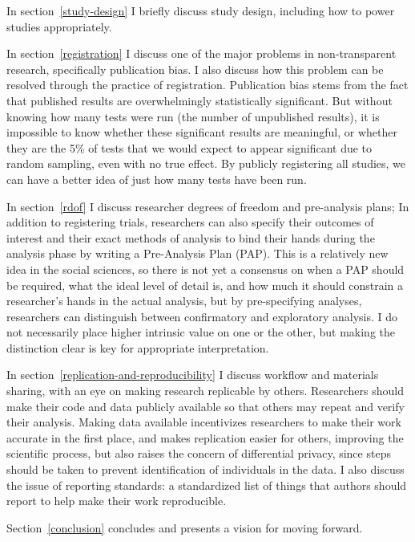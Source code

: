 \documentclass[12pt] {article}
\begin{document}
In section~\ref{study-design} I briefly discuss study design, including how to power studies
appropriately.

In section~\ref{registration} I discuss one of the major problems in non-transparent
research, specifically publication bias. I also discuss how this
problem can be resolved through the practice of registration.
Publication bias stems from the fact that published results are
overwhelmingly statistically significant. But without knowing how many
tests were run (the number of unpublished results), it is impossible to know whether these significant
results are meaningful, or whether they are the 5\% of tests that we
would expect to appear significant due to random sampling, even with no
true effect. By publicly registering all studies, we can have a better
idea of just how many tests have been run.

In section~\ref{rdof} I discuss researcher degrees of freedom and pre-analysis
plans; In addition to registering trials, researchers can also
specify their outcomes of interest and their exact methods of analysis
to bind their hands during the analysis phase by writing a Pre-Analysis
Plan (PAP). This is a relatively new idea in the social sciences, so
there is not yet a consensus on when a PAP should be required, what the
ideal level of detail is, and how much it should constrain a
researcher's hands in the actual analysis, but by pre-specifying analyses,
researchers can distinguish between confirmatory and exploratory
analysis. I do not necessarily place higher intrinsic value on one or
the other, but making the distinction clear is key for appropriate
interpretation.

In section~\ref{replication-and-reproducibility} I discuss workflow and materials sharing, with an eye on
making research replicable by others. Researchers should make their code
and data publicly available so that others may repeat and verify their
analysis. Making data available incentivizes researchers to make their
work accurate in the first place, and makes replication easier for
others, improving the scientific process, but also raises the concern of
differential privacy, since steps should be taken to prevent
identification of individuals in the data. I also discuss the issue of
reporting standards: a standardized list of things that authors should
report to help make their work reproducible.

Section~\ref{conclusion} concludes and presents a vision for moving forward.

\end{document}
